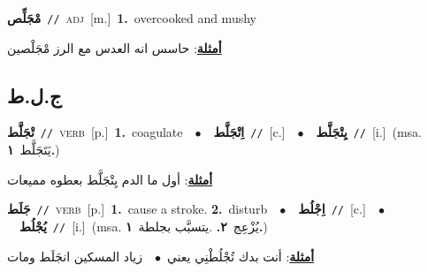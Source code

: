 \documentclass[10pt,a4paper,twoside]{article} %
\begin{document}
\begin{multicols}{2}
{\setlength\topsep{0pt}\textbf{\foreignlanguage{arabic}{مْجَلِّص}}\ {\color{gray}\texttt{//}\color{black}}\ \textsc{adj}\ [m.]\ \textbf{1.}~overcooked and mushy\  \begin{flushright}\color{gray}\foreignlanguage{arabic}{\textbf{\underline{\foreignlanguage{arabic}{أمثلة}}}: حاسس انه العدس مع الرز مْجَلْصين}\end{flushright}\color{black}} \vspace{2mm}

\vspace{-3mm}
\subsection*{\color{blue}\foreignlanguage{arabic}{ج.ل.ط}\color{blue}{}} 

{\setlength\topsep{0pt}\textbf{\foreignlanguage{arabic}{تْجَلَّط}}\ {\color{gray}\texttt{//}\color{black}}\ \textsc{verb}\ [p.]\ \textbf{1.}~coagulate\ \ $\bullet$\ \ \setlength\topsep{0pt}\textbf{\foreignlanguage{arabic}{اِتْجَلَّط}}\ {\color{gray}\texttt{//}\color{black}}\ [c.]\ \ $\bullet$\ \ \setlength\topsep{0pt}\textbf{\foreignlanguage{arabic}{يِتْجَلَّط}}\ {\color{gray}\texttt{//}\color{black}}\ [i.]\ \color{gray}(msa. \foreignlanguage{arabic}{يَتَجَلَّط}~\foreignlanguage{arabic}{\textbf{١.}})\color{black}\  \begin{flushright}\color{gray}\foreignlanguage{arabic}{\textbf{\underline{\foreignlanguage{arabic}{أمثلة}}}: أول ما الدم يِتْجَلَّط بعطوه مميعات}\end{flushright}\color{black}} \vspace{2mm}

{\setlength\topsep{0pt}\textbf{\foreignlanguage{arabic}{جَلَط}}\ {\color{gray}\texttt{//}\color{black}}\ \textsc{verb}\ [p.]\ \textbf{1.}~cause a stroke.  \textbf{2.}~disturb\ \ $\bullet$\ \ \setlength\topsep{0pt}\textbf{\foreignlanguage{arabic}{اِجْلُط}}\ {\color{gray}\texttt{//}\color{black}}\ [c.]\ \ $\bullet$\ \ \setlength\topsep{0pt}\textbf{\foreignlanguage{arabic}{يُجْلُط}}\ {\color{gray}\texttt{//}\color{black}}\ [i.]\ \color{gray}(msa. \foreignlanguage{arabic}{يُزْعِج}~\foreignlanguage{arabic}{\textbf{٢.}}  .\foreignlanguage{arabic}{يتسبَّب بجلطة}~\foreignlanguage{arabic}{\textbf{١.}})\color{black}\  \begin{flushright}\color{gray}\foreignlanguage{arabic}{\textbf{\underline{\foreignlanguage{arabic}{أمثلة}}}: أنت بدك تُجْلُطْنِي يعني\ $\bullet$\ \  زياد المسكين انجَلَط ومات}\end{flushright}\color{black}} \vspace{2mm}


\end{multicols}
\end{document}

